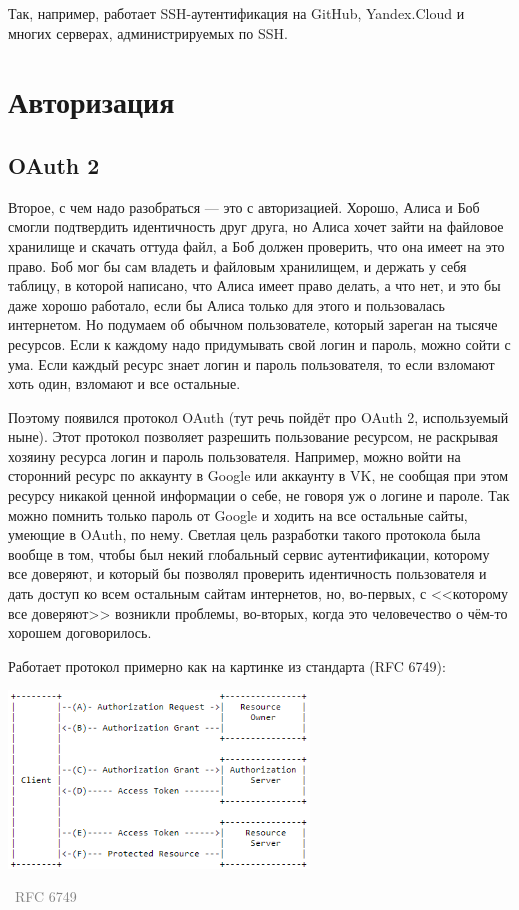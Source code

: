 \documentclass[a5paper]{article}
\newcommand{\attribution}[1] {
\vspace{-5mm}\begin{flushright}\begin{scriptsize}\textcolor{gray}{\textcopyright\, #1}\end{scriptsize}\end{flushright}
}
\begin{document}
Так, например, работает SSH-аутентификация на GitHub, Yandex.Cloud и многих серверах, администрируемых по SSH.

\section{Авторизация}

\subsection{OAuth 2}

Второе, с чем надо разобраться --- это с авторизацией. Хорошо, Алиса и Боб смогли подтвердить идентичность друг друга, но Алиса хочет зайти на файловое хранилище и скачать оттуда файл, а Боб должен проверить, что она имеет на это право. Боб мог бы сам владеть и файловым хранилищем, и держать у себя таблицу, в которой написано, что Алиса имеет право делать, а что нет, и это бы даже хорошо работало, если бы Алиса только для этого и пользовалась интернетом. Но подумаем об обычном пользователе, который зареган на тысяче ресурсов. Если к каждому надо придумывать свой логин и пароль, можно сойти с ума. Если каждый ресурс знает логин и пароль пользователя, то если взломают хоть один, взломают и все остальные.

Поэтому появился протокол OAuth (тут речь пойдёт про OAuth 2, используемый ныне). Этот протокол позволяет разрешить пользование ресурсом, не раскрывая хозяину ресурса логин и пароль пользователя. Например, можно войти на сторонний ресурс по аккаунту в Google или аккаунту в VK, не сообщая при этом ресурсу никакой ценной информации о себе, не говоря уж о логине и пароле. Так можно помнить только пароль от Google и ходить на все остальные сайты, умеющие в OAuth, по нему. Светлая цель разработки такого протокола была вообще в том, чтобы был некий глобальный сервис аутентификации, которому все доверяют, и который бы позволял проверить идентичность пользователя и дать доступ ко всем остальным сайтам интернетов, но, во-первых, с <<которому все доверяют>> возникли проблемы, во-вторых, когда это человечество о чём-то хорошем договорилось.

Работает протокол примерно как на картинке из стандарта (RFC 6749):

\begin{center}
    \includegraphics[width=0.6\textwidth]{oauth.png}
    \attribution{RFC 6749}
\end{center}
\end{document}
